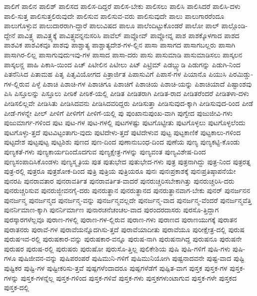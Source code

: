 {ಪಾಲಿಗೆ
ಪಾಲಿನ
ಪಾಲಿಶ್
ಪಾಲಿಸದ
ಪಾಲಿಸ-ದಿದ್ದರೆ
ಪಾಲಿಸ-ಬೇಕು
ಪಾಲಿಸಲು
ಪಾಲಿಸಿ
ಪಾಲಿಸಿದರೆ
ಪಾಲಿಸಿ-ದಳು
ಪಾಲಿ-ಸುತ್ತ
ಪಾಲಿಸುತ್ತಲಿರುವುದೇ
ಪಾಲಿಸುವ
ಪಾಲಿಸುವ-ವರು
ಪಾಲಿಸುವುದೇ
ಪಾಲು
ಪಾಲುಗಾರರೆಂದೂ
ಪಾಲುಗೊಳ್ಳುವ
ಪಾಲುದಾರರಾಗಿ-ದ್ದಾರೆ
ಪಾಲುವಿಷದ
ಪಾಲೂ
ಪಾಲೆಂದಿಟ್ಟುಕೊಂಡರೆ
ಪಾಲೋ
ಪಾಲ್
ಪಾಲ್ಗೊಂಡಿ-ದ್ದೇನೆ
ಪಾವಿತ್ರ್ಯ
ಪಾವಿತ್ರ್ಯಕ್ಕೆ
ಪಾವಿತ್ರ್ಯವನ್ನನುಸರಿಸಿ
ಪಾವೆಲ್
ಪಾವ್ಲೋವ್
ಪಾವ್ಲೋವ್ನ
ಪಾಶ
ಪಾಶಕ್ಕೊಳಗಾದ
ಪಾಶದ
ಪಾಶವಿಕ
ಪಾಶವಿಕವೂ
ಪಾಶವು
ಪಾಶ್ಚಾತ್ಯ
ಪಾಶ್ಚಾತ್ಯದೇಶ-ಗಳ-ಲ್ಲಿನ
ಪಾಸಾ
ಪಾಸಾಗದ
ಪಾಸಾಗಬಲ್ಲರು
ಪಾಸಾಗಿ
ಪಾಸಾಗಿರ-ಲಿಲ್ಲ
ಪಾಸಾಗುವುದುಇವು-ಗಳ
ಪಾಸಾದ
ಪಾಸಾ-ದರು
ಪಾಸು
ಪಾಸುಮಾಡಿ
ಪಾಸುಮಾಡಿಸಲು
ಪಾಸ್ಕಲನ
ಪಾಸ್ಕಲನ್ಣ
ಪಾಹಿ
ಪಿಕಾಸಿ-ಯಿಂದ
ಪಿಚ್
ಪಿಟೀಲಿನ
ಪಿಟೀಲು
ಪಿಟ್
ಪಿಟ್ರಿಮ್
ಪಿಡಬ್ಲ್ಯುಡಿ
ಪಿಡುಗನ್ನು
ಪಿಡುಗಿ-ನಿಂದ
ಪಿತನೆನಿಸಿದ
ಪಿತಾಮಹ
ಪಿತೃ
ಪಿತೃವಿಯೋಗದ
ಪಿತ್ರಾರ್ಜಿತ
ಪಿಪಾಸುವಿಗೆ
ಪಿಪಾಸೆ-ಗಳ
ಪಿಯಾನೊ
ಪಿಯುಸಿ
ಪಿರಮಿಡ್ಡು-ಗಳ-ಲ್ಲಿರುವ
ಪಿಳ್ಳೆ
ಪಿಶಾಚಿ
ಪಿಶಾಚಿ-ಗಳ
ಪಿಶಾಚಿಗೂ
ಪಿಶಾಚಿಗೆ
ಪಿಶಾಚಿಯ
ಪಿಶಾಚಿ-ಯನ್ನು
ಪಿಶಾಚಿಯಾದೆ
ಪಿಷ್ಟಾಂಶವು
ಪಿಸಿ
ಪಿಸ್ತೂಲನ್ನು
ಪಿಸ್ತೂಲು
ಪೀಠಿಕೆ
ಪೀಠಿಕೆ-ಯಲ್ಲಿ
ಪೀಡಿತ
ಪೀಡಿತರಾಗಿ
ಪೀಡಿತ-ರಾದ
ಪೀಡಿತರೆಂದರೆ
ಪೀಡಿತಳಾ-ದಳು
ಪೀಡಿಸಲಿಲ್ಲವೇ
ಪೀಡಿಸಿತು
ಪೀಡಿಸಿದವನು
ಪೀಡಿಸಿದವರಿದ್ದರು
ಪೀಡಿಸುತ್ತಾ
ಪೀಡಿಸುವುದ-ಕ್ಕಾಗಿ
ಪೀಡಿಸುವುದ-ರಿಂದ
ಪೀಡೆ
ಪೀಡೆ-ಗಳನ್ನೇ
ಪೀಲ್
ಪೀಳಿಗೆ
ಪೀಳಿಗೆಗೆ
ಪೀಳಿಗೆ-ಯಲ್ಲಿ
ಪು
ಪುಂಖಾನುಪುಂಖ-ವಾಗಿ
ಪುಗ್ವೇದ
ಪುಜುಜೀವಿ-ಗಳು
ಪುಜುಮಾರ್ಗ-ಗಳಿಂದ
ಪುಟ
ಪುಟ-ಗಳ
ಪುಟ-ಗಳಲ್ಲಿ
ಪುಟಗಳಷ್ಟು
ಪುಟಗೊಟ್ಟೀತು
ಪುಟಗೊಳ್ಳಲು
ಪುಟಗೊಳ್ಳಲೆಂದು
ಪುಟಗೊಳ್ಳು-ತ್ತದೆ
ಪುಟವಿಟ್ಟಂತಾಗು-ವುದು
ಪುಟಿದೇಳು-ತ್ತದೆ
ಪುಟಿದೇಳುವ
ಪುಟ್ಟ
ಪುಟ್ಟಕಾಣಿಕೆ
ಪುಟ್ಟಕಾಲು-ಗಳಿಂದ
ಪುಟ್ಟದೇಶ
ಪುಟ್ಟಪುಟ್ಟ
ಪುಟ್ಟಶಿಶು
ಪುಣದ
ಪುಣ-ದಿಂದ
ಪುಣಾನುಬಂಧ-ದಿಂದ
ಪುಣೆಯ
ಪುಣ್ಯ
ಪುಣ್ಯಕಟ್ಟಿ-ಕೊಂಡು
ಪುಣ್ಯಕತೆ-ಗಳು
ಪುಣ್ಯಕಾರ್ಯದಿಂದೊದಗುವ
ಪುಣ್ಯಕ್ಷೇತ್ರ-ಗಳನ್ನು
ಪುಣ್ಯವಂತ
ಪುಣ್ಯವಿಶೇಷ-ದಿಂದ
ಪುಣ್ಯಸಂಪಾದಿಸಿಕೊಂಡಳು
ಪುಣ್ಯಸ್ಮೃತಿಯ
ಪುತ
ಪುತುಭೇದ
ಪುತುಭೇದ-ಗಳು
ಪುತ್ರ
ಪುತ್ರನಾಗಿದ್ದು
ಪುತ್ರ-ನಿಂದ
ಪುತ್ರರತ್ನ
ಪುತ್ರ-ರಲ್ಲಿ
ಪುತ್ರರೂ
ಪುತ್ರಶೋಕ-ದಿಂದ
ಪುತ್ರಿ
ಪುತ್ರಿಯ
ಪುತ್ರಿಯರೂ
ಪುನಃ
ಪುನಃಪ್ರಕಾಶಕ್ಕೆ
ಪುನಃಪ್ರತಿಷ್ಠಾಪನೆಯೇ
ಪುನರಪಿ
ಪುನರಾವತಾರ
ಪುನರಾವರ್ತಿತ
ಪುನರಾವರ್ತಿತ-ವಾದರೆ
ಪುನರುಚ್ಚರಿಸಬೇಕಾಗಿತ್ತು
ಪುನರುಚ್ಚರಿಸಿ-ದರು
ಪುನರುಚ್ಚರಿಸುವ
ಪುನರುಜ್ಜೀವನಗೈ-ದರು
ಪುನರುತ್ಥಾನ
ಪುನರುತ್ಥಾನದ
ಪುನರುತ್ಥಾನವಾಗ-ಬೇಕು
ಪುನರ್
ಪುನರ್ಜನನ
ಪುನರ್ಜನ್ಮ
ಪುನರ್ಜನ್ಮದ
ಪುನರ್ಜನ್ಮ-ವನ್ನು
ಪುನರ್ಜನ್ಮವಲ್ಲದೇ
ಪುನರ್ಜನ್ಮ-ವಾದ
ಪುನರ್ಜನ್ಮ-ವೆಂದರೆ
ಪುನರ್ಜನ್ಮವೆತ್ತಿ
ಪುನರ್ನಿಮಾಣ-ಕ್ಕಾಗಿ
ಪುನರ್ನಿರ್ಮಾಣ
ಪುನಾರಚನೆಚಂಚಲ-ವಾದ
ಪುರಂದರದಾಸರು
ಪುರಸೊ-ತ್ತಿದ್ದಾಗ
ಪುರಸ್ಕಾರಗಳೆಲ್ಲವೂ
ಪುರಾಣ-ಗಳಲ್ಲಿ
ಪುರಾಣ-ಗಳ-ಲ್ಲಿರುವ
ಪುರಾಣ-ಗಳು
ಪುರಾಣದ
ಪುರಾಣಯುಗಕ್ಕೆ
ಪುರಾತನ
ಪುರಾತನರು
ಪುರಾವೆ-ಗಳ
ಪುರಾವೆಯನ್ನೊದಗಿಸು-ತ್ತದೆ
ಪುರಾವೆಯಾದೀತು
ಪುರಾವೆಯೂ
ಪುರೀಕ್ಷೇತ್ರ-ದಲ್ಲಿ
ಪುರುಷ
ಪುರುಷಇವ-ರಲ್ಲಿ
ಪುರುಷಕಾರ-ವನ್ನು
ಪುರುಷಕಾರ-ವನ್ನೂ
ಪುರುಷ-ನಾಗಿ
ಪುರುಷನಾಗಿದ್ದ
ಪುರುಷನೂ
ಪುರುಷನೇ
ಪುರುಷರ
ಪುರುಷ-ರಲ್ಲಿ
ಪುರುಷರು
ಪುರುಷೋ
ಪುರುಸೊ-ತ್ತಿಲ್ಲ
ಪುಲಿಕೇಶಿಯ
ಪುಷಿ
ಪುಷಿ-ಗಳಿಗೆ
ಪುಷಿ-ಗಳು
ಪುಷಿ-ಗಳೂ
ಪುಷಿಜೀವನ-ವನ್ನು
ಪುಷಿಪರಂಪರೆ
ಪುಷಿಮುನಿ-ಗಳಿಗೆ
ಪುಷಿಮುನಿಯೋಗಿ
ಪುಷ್ಟನಾದವನೇ
ಪುಷ್ಟ-ವಾದ
ಪುಷ್ಟಿ
ಪುಷ್ಟಿಕರ
ಪುಷ್ಟಿ-ಗಳ
ಪುಷ್ಟೀಕರಿಸು-ತ್ತವೆ
ಪುಷ್ಪಗಳೆಂದಾದರೂ
ಪುಷ್ಪಗಳೆಡೆಗೆ
ಪುಷ್ಪಿತ-ವಾಗ
ಪುಸ್ತಕ
ಪುಸ್ತಕ-ಗಳ
ಪುಸ್ತಕ-ಗಳನ್ನು
ಪುಸ್ತಕ-ಗಳನ್ನೆಲ್ಲ
ಪುಸ್ತಕ-ಗಳಿಂದ
ಪುಸ್ತಕ-ಗಳಿವೆ
ಪುಸ್ತಕ-ಗಳು
ಪುಸ್ತಕಗಳುಂಟಾಗುವ
ಪುಸ್ತಕ-ಗಳೇ
ಪುಸ್ತಕದ
ಪುಸ್ತಕ-ದಲ್ಲಿ
}
